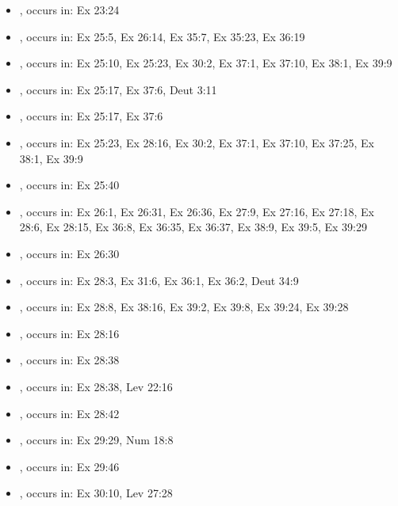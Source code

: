 \documentclass[14pt]{article}
\begin{document}
\begin{itemize}
\item {}, occurs in: Ex 23:24

\item {}, occurs in: Ex 25:5, Ex 26:14, Ex 35:7, Ex 35:23, Ex 36:19

\item {}, occurs in: Ex 25:10, Ex 25:23, Ex 30:2, Ex 37:1, Ex 37:10, Ex 38:1, Ex 39:9

\item {}, occurs in: Ex 25:17, Ex 37:6, Deut 3:11

\item {}, occurs in: Ex 25:17, Ex 37:6

\item {}, occurs in: Ex 25:23, Ex 28:16, Ex 30:2, Ex 37:1, Ex 37:10, Ex 37:25, Ex 38:1, Ex 39:9

\item {}, occurs in: Ex 25:40

\item {}, occurs in: Ex 26:1, Ex 26:31, Ex 26:36, Ex 27:9, Ex 27:16, Ex 27:18, Ex 28:6, Ex 28:15, Ex 36:8, Ex 36:35, Ex 36:37, Ex 38:9, Ex 39:5, Ex 39:29

\item {}, occurs in: Ex 26:30

\item {}, occurs in: Ex 28:3, Ex 31:6, Ex 36:1, Ex 36:2, Deut 34:9

\item {}, occurs in: Ex 28:8, Ex 38:16, Ex 39:2, Ex 39:8, Ex 39:24, Ex 39:28

\item {}, occurs in: Ex 28:16

\item {}, occurs in: Ex 28:38

\item {}, occurs in: Ex 28:38, Lev 22:16

\item {}, occurs in: Ex 28:42

\item {}, occurs in: Ex 29:29, Num 18:8

\item {}, occurs in: Ex 29:46

\item {}, occurs in: Ex 30:10, Lev 27:28


\end{itemize}
\end{document}
